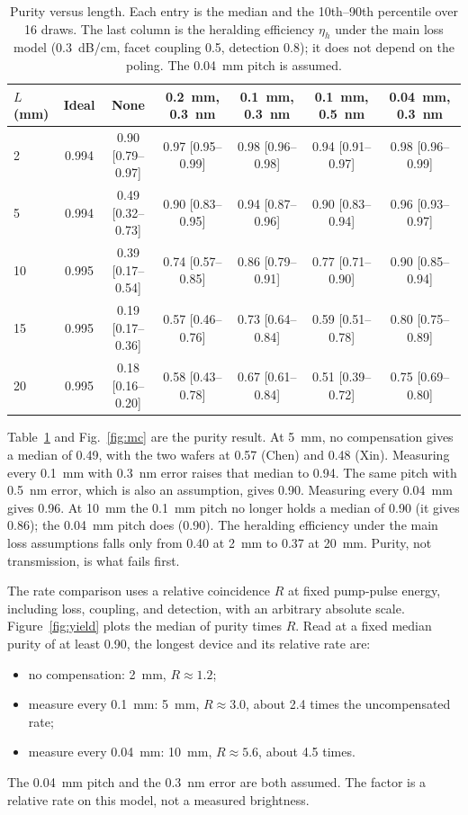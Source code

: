 \documentclass[11pt,a4paper]{article}
\begin{document}
\begin{table}[t]
\centering
\setlength{\tabcolsep}{2.2pt}
\footnotesize
\caption{Purity versus length.
Each entry is the median and the 10th--90th percentile over 16 draws.
The last column is the heralding efficiency $\eta_{h}$ under the main loss model (0.3~dB/cm, facet coupling 0.5, detection 0.8); it does not depend on the poling.
The 0.04~mm pitch is assumed.}
\label{tab:mc}
\small
\begin{tabular}{lcccccc}
\toprule
$L$ (mm) & Ideal & None & 0.2~mm, 0.3~nm & 0.1~mm, 0.3~nm & 0.1~mm, 0.5~nm & 0.04~mm, 0.3~nm \\
\midrule
2  & 0.994 & 0.90 [0.79--0.97] & 0.97 [0.95--0.99] & 0.98 [0.96--0.98] & 0.94 [0.91--0.97] & 0.98 [0.96--0.99] \\
5  & 0.994 & 0.49 [0.32--0.73] & 0.90 [0.83--0.95] & 0.94 [0.87--0.96] & 0.90 [0.83--0.94] & 0.96 [0.93--0.97] \\
10 & 0.995 & 0.39 [0.17--0.54] & 0.74 [0.57--0.85] & 0.86 [0.79--0.91] & 0.77 [0.71--0.90] & 0.90 [0.85--0.94] \\
15 & 0.995 & 0.19 [0.17--0.36] & 0.57 [0.46--0.76] & 0.73 [0.64--0.84] & 0.59 [0.51--0.78] & 0.80 [0.75--0.89] \\
20 & 0.995 & 0.18 [0.16--0.20] & 0.58 [0.43--0.78] & 0.67 [0.61--0.84] & 0.51 [0.39--0.72] & 0.75 [0.69--0.80] \\
\bottomrule
\end{tabular}
\end{table}

Table~\ref{tab:mc} and Fig.~\ref{fig:mc} are the purity result.
At 5~mm, no compensation gives a median of 0.49, with the two wafers at 0.57 (Chen) and 0.48 (Xin).
Measuring every 0.1~mm with 0.3~nm error raises that median to 0.94.
The same pitch with 0.5~nm error, which is also an assumption, gives 0.90.
Measuring every 0.04~mm gives 0.96.
At 10~mm the 0.1~mm pitch no longer holds a median of 0.90 (it gives 0.86); the 0.04~mm pitch does (0.90).
The heralding efficiency under the main loss assumptions falls only from 0.40 at 2~mm to 0.37 at 20~mm.
Purity, not transmission, is what fails first.

The rate comparison uses a relative coincidence $R$ at fixed pump-pulse energy, including loss, coupling, and detection, with an arbitrary absolute scale.
Figure~\ref{fig:yield} plots the median of purity times $R$.
Read at a fixed median purity of at least 0.90, the longest device and its relative rate are:
\begin{itemize}
\item no compensation: 2~mm, $R\approx 1.2$;
\item measure every 0.1~mm: 5~mm, $R\approx 3.0$, about 2.4 times the uncompensated rate;
\item measure every 0.04~mm: 10~mm, $R\approx 5.6$, about 4.5 times.
\end{itemize}
The 0.04~mm pitch and the 0.3~nm error are both assumed.
The factor is a relative rate on this model, not a measured brightness.
\end{document}
